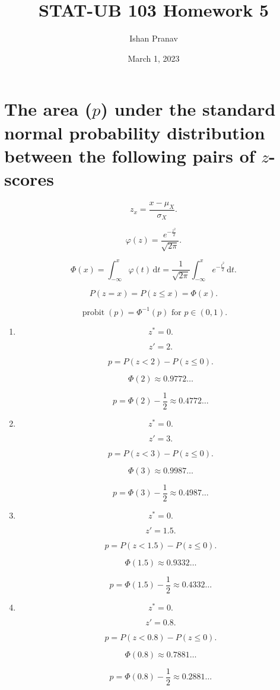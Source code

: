 \documentclass[12pt]{article}
\title{STAT-UB 103 Homework 5}
\author{Ishan Pranav}
\date{March 1, 2023}
\DeclareMathOperator{\probit}{probit}
\begin{document}
\maketitle
\section{The area ($p$) under the standard normal probability distribution between the following pairs of $z$-scores}
\[z_x=\frac{x-\mu_X}{\sigma_X}.\]

\[\varphi(z)=\frac{e^{-\frac{z^2}{2}}}{\sqrt{2\pi}}.\]

\[\Phi(x)=\int^x_{-\infty}{\varphi(t)\,\mathrm{d}t}=\frac{1}{\sqrt{2\pi}}\int^x_{-\infty}{e^{-\frac{t^2}{2}}\,\mathrm{d}t}.\]

\[P(z=x)=P(z\leq x)=\Phi(x).\]

\[\probit(p)=\Phi^{-1}(p)\text{ for } p\in(0,1).\]
\begin{enumerate}
\item
\[z^*=0.\]

\[z'=2.\]

\[p=P(z<2)-P(z\leq 0).\]

\[\Phi(2)\approx 0.9772\dots\]

\[p=\Phi(2)-\frac{1}{2}\approx 0.4772\dots\]
\item
\[z^*=0.\]

\[z'=3.\]

\[p=P(z<3)-P(z\leq 0).\]

\[\Phi(3)\approx 0.9987\dots\]

\[p=\Phi(3)-\frac{1}{2}\approx 0.4987\dots\]
\item
\[z^*=0.\]

\[z'=1.5.\]

\[p=P(z<1.5)-P(z\leq 0).\]

\[\Phi(1.5)\approx 0.9332\dots\]

\[p=\Phi(1.5)-\frac{1}{2}\approx 0.4332\dots\]
\item
\[z^*=0.\]

\[z'=0.8.\]

\[p=P(z<0.8)-P(z\leq 0).\]

\[\Phi(0.8)\approx 0.7881\dots\]

\[p=\Phi(0.8)-\frac{1}{2}\approx 0.2881\dots\]
\end{enumerate}
\end{document}
